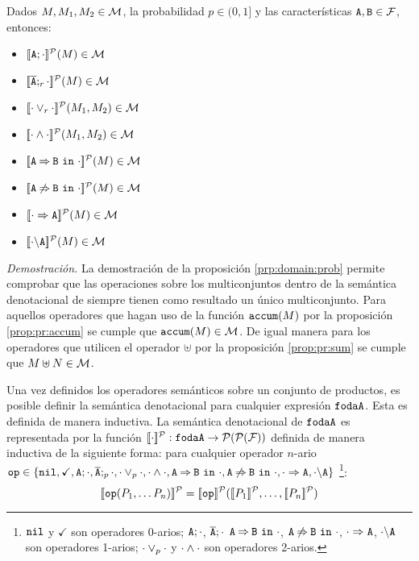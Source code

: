 




\bprop\label{prp:domain:prob}
  Dados  $M,M_{1}, M_{2}\in{\cal M}$,
  la probabilidad $p\in(0,1]$ y
  las características $\mathtt{A},\mathtt{B}\in{\cal F}$, entonces:
  \begin{itemize}
  \item $[\![\mathtt{A};\cdot]\!]^{\cal P}(M)\in{\cal M}$
  \item $[\![\overline{\mathtt{A}};_{r}\cdot]\!]^{\cal P}(M)\in{\cal M}$
  \item $[\![\cdot\mathbin{\lor}_{r}\cdot]\!]^{\cal P}(M_{1},M_{2})\in{\cal M}$
  \item $[\![\cdot\mathbin{\wedge}\cdot]\!]^{\cal P}(M_{1},M_{2})\in{\cal M}$
  \item $[\![\mathtt{A}\mathbin{\Rightarrow}\mathtt{B}\ \mathtt{in}\ \cdot]\!]^{\cal P}(M)\in{\cal M}$
  \item $[\![\mathtt{A}\mathbin{\not\Rightarrow}\mathtt{B}\ \mathtt{in}\ \cdot]\!]^{\cal P}(M)\in{\cal M}$
  \item $[\![\cdot\Rightarrow\mathtt{A}]\!]^{\cal P}(M)\in{\cal M}$
  \item $[\![\cdot\backslash\mathtt{A}]\!]^{\cal P}(M)\in{\cal M}$
  \end{itemize}


\textit{Demostración.}
La demostración de la proposición \ref{prp:domain:prob}
permite comprobar que las operaciones sobre los multiconjuntos
dentro de la semántica denotacional de \fodaPAp
siempre tienen como resultado un único multiconjunto.
%
Para aquellos operadores que hagan uso de la función $\mathtt{accum}(M)$
por la proposición \ref{prop:pr:accum} se cumple que $\mathtt{accum}(M)\in{\cal M}$.
De igual manera para los operadores que utilicen el 
operador $\uplus$ por la proposición \ref{prop:pr:sum} se cumple que 
$M \uplus N \in{\cal M}$.
\eprop

Una vez definidos los operadores semánticos sobre un conjunto de productos,
es posible definir la semántica denotacional para cualquier
expresión $\mathtt{fodaA}$.
Esta es definida de manera inductiva.
\bdfn
  La semántica denotacional de $\mathtt{fodaA}$ es representada por la función
  $[\![\cdot]\!]^{\cal P}:\mathtt{fodaA}\rightarrow{\cal P}({\cal P}({\cal F}))$ definida de manera inductiva
  de la siguiente forma: para cualquier operador $n$-ario $\mathtt{op}\in\{\mathtt{nil}, \checkmark ,
  \mathtt{A};\cdot, \overline{\mathtt{A}};_{p}\cdot , \cdot\mathbin{\lor}_{p}\cdot,
  \cdot\mathbin{\wedge}\cdot, \mathtt{A}\mathbin{\Rightarrow}\mathtt{B}\ \mathtt{in}\ \cdot,\mathtt{A}\mathbin{\not\Rightarrow}\mathtt{B}\ \mathtt{in}\ \cdot,
  \cdot\Rightarrow\mathtt{A}, \cdot\backslash\mathtt{A}\}$%
\footnote{$\mathtt{nil}$ y $\checkmark$ son operadores 0-arios;
  $\mathtt{A};\cdot$, $\overline{\mathtt{A}};\cdot$
  $\mathtt{A}\mathbin{\Rightarrow}\mathtt{B}\ \mathtt{in}\ \cdot$, $\mathtt{A}\mathbin{\not\Rightarrow}\mathtt{B}\ \mathtt{in}\ \cdot$,
  $\cdot\Rightarrow\mathtt{A}$, $\cdot\backslash\mathtt{A}$ son operadores 1-arios;
  $\cdot\mathbin{\lor}_p\cdot$ y $\cdot\mathbin{\wedge}\cdot$ son operadores 2-arios.}:
  $$\semdenp{\op(P_1,\ldots P_n)}=\semdenp{\op}(\semdenp{P_1},\ldots,\semdenp{P_n})$$
\edfn




